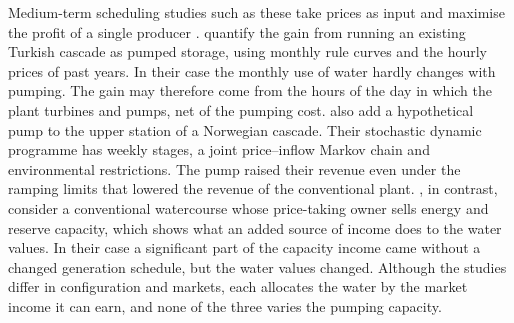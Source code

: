 Medium-term scheduling studies such as these take prices as input and
maximise the profit of a single producer
\citep{ak2019quantifying,alic2023optimal,helseth2016}.
\citet{ak2019quantifying} quantify the gain from running an existing
Turkish cascade as pumped storage, using monthly rule curves and the hourly
prices of past years.
In their case the monthly use of water hardly changes with pumping. The
gain may therefore come from the hours of the day in which the plant
turbines and pumps, net of the pumping cost.
\citet{alic2023optimal} also add a hypothetical pump to the upper station
of a Norwegian cascade. Their stochastic dynamic programme has weekly
stages, a joint price--inflow Markov chain and environmental restrictions.
The pump raised their revenue even under the ramping limits that lowered
the revenue of the conventional plant.
\citet{helseth2016}, in contrast, consider a conventional watercourse
whose price-taking owner sells energy and reserve capacity, which shows
what an added source of income does to the water values.
In their case a significant part of the capacity income came without a
changed generation schedule, but the water values changed.
Although the studies differ in configuration and markets, each allocates
the water by the market income it can earn, and none of the three varies
the pumping capacity.
